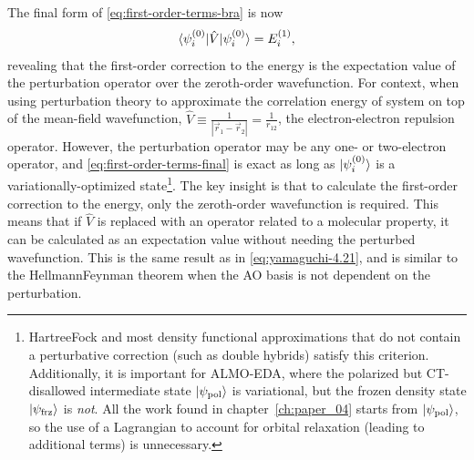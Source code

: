 \documentclass[%
class = book,%
crop = false,%
float = true,%
multi = true,%
preview = false,%
]{standalone}
\newcommand\hefe{Hellmann\textendash{}Feynman}
\newcommand\hf{Hartree\textendash{}Fock}
\begin{document}
The final form of \eqref{eq:first-order-terms-bra} is now
\begin{equation}
  \label{eq:first-order-terms-final}
  \braket{\psi_{i}^{(0)} | \hat{V} | \psi_{i}^{(0)}} = E_{i}^{(1)},
\end{equation}
revealing that the first-order correction to the energy is the expectation value of the perturbation operator over the zeroth-order wavefunction. For context, when using perturbation theory to approximate the correlation energy of system on top of the mean-field wavefunction, \(\hat{V} \equiv \frac{1}{|\vec{r}_{1} - \vec{r}_{2}|} = \frac{1}{r_{12}}\), the electron-electron repulsion operator. However, the perturbation operator may be any one- or two-electron operator, and \eqref{eq:first-order-terms-final} is exact as long as \(\ket{\psi_{i}^{(0)}}\) is a variationally-optimized state\footnote{\hf{} and most density functional approximations that do not contain a perturbative correction (such as double hybrids) satisfy this criterion. Additionally, it is important for ALMO-EDA, where the polarized but CT-disallowed intermediate state \(\ket{\psi_{\text{pol}}}\) is variational, but the frozen density state \(\ket{\psi_{\text{frz}}}\) is \emph{not}. All the work found in chapter~\ref{ch:paper_04} starts from \(\ket{\psi_{\text{pol}}}\), so the use of a Lagrangian to account for orbital relaxation (leading to additional terms) is unnecessary.}. The key insight is that to calculate the first-order correction to the energy, only the zeroth-order wavefunction is required. This means that if \(\hat{V}\) is replaced with an operator related to a molecular property, it can be calculated as an expectation value without needing the perturbed wavefunction. This is the same result as in \eqref{eq:yamaguchi-4.21}, and is similar to the \hefe{} theorem when the AO basis is not dependent on the perturbation.
\end{document}
